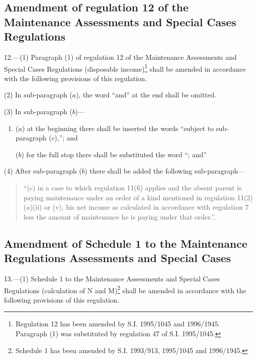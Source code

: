 \documentclass[a4paper]{article}
\begin{document}
\subsection[12. Amendment of regulation 12 of the Maintenance Assessments and Special Cases Regulations]{Amendment of regulation 12 of the Maintenance Assessments and Special Cases Regulations}

12.—(1) Paragraph (1) of regulation 12 of the Maintenance Assessments and Special Cases Regulations (disposable income)\footnote{\frenchspacing Regulation 12 has been amended by S.I. 1995/1045 and 1996/1945. Paragraph (1) was substituted by regulation 47 of S.I. 1995/1045.} shall be amended in accordance with the following provisions of this regulation.

(2) In sub-paragraph ($a$), the word “and” at the end shall be omitted.

(3) In sub-paragraph ($b$)—
\begin{enumerate}\item[]
($a$) at the beginning there shall be inserted the words “subject to sub-paragraph ($c$),”; and

($b$) for the full stop there shall be substituted the word “; and”
\end{enumerate}

(4) After sub-paragraph ($b$) there shall be added the following sub-\hspace{0pt}paragraph—
\begin{quotation}
“($c$) in a case to which regulation 11(6) applies and the absent parent is paying maintenance under an order of a kind mentioned in regulation 11(2)($a$)(ii) or (v), his net income as calculated in accordance with regulation 7 less the amount of maintenance he is paying under that order.”.
\end{quotation}

\subsection[13. Amendment of Schedule 1 to the Maintenance Regulations Assessments and Special Cases]{Amendment of Schedule 1 to the Maintenance Regulations Assessments and Special Cases}

13.—(1) Schedule 1 to the Maintenance Assessments and Special Cases Regulations (calculation of N and M)\footnote{\frenchspacing Schedule 1 has been amended by S.I. 1993/913, 1995/1045 and 1996/1945.} shall be amended in accordance with the following provisions of this regulation.
\end{document}
